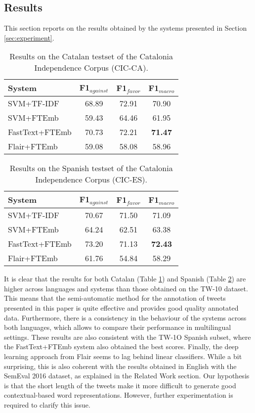 \documentclass[10pt, a4paper]{article}
\begin{document}
\subsection{Results}\label{sec:results}

This section reports on the results obtained by the systems presented in Section \ref{sec:experiment}.

\begin{table}[!ht]
\begin{tabular}{lccc}\hline
\textbf{System} & F1$_{against}$ & F1$_{favor}$ & F1$_{macro}$ \\ \hline
SVM+TF-IDF & 68.89 & 72.91 & 70.90 \\
SVM+FTEmb & 59.43 & 64.46 & 61.95 \\
FastText+FTEmb & 70.73 & 72.21 & \textbf{71.47} \\
Flair+FTEmb & 59.08 & 58.08 & 58.96 \\ \hline
\end{tabular}
\caption{Results on the Catalan testset of the Catalonia Independence Corpus (CIC-CA).}\label{tab:result_indep_ca}
\end{table}

\begin{table}[!ht]
\centering
\begin{tabular}{lccc}\hline
\textbf{System} & F1$_{against}$ & F1$_{favor}$ & F1$_{macro}$ \\ \hline
SVM+TF-IDF & 70.67 & 71.50 & 71.09 \\
SVM+FTEmb & 64.24 & 62.51 & 63.38 \\
FastText+FTEmb & 73.20 & 71.13 & \textbf{72.43} \\
Flair+FTEmb & 61.76 & 54.84 & 58.29 \\ \hline
\end{tabular}
\caption{Results on the Spanish testset of the Catalonia Independence Corpus (CIC-ES).}\label{tab:result_indep_es}
\end{table}

It is clear that the results for both Catalan (Table \ref{tab:result_indep_ca}) and Spanish (Table \ref{tab:result_indep_es}) are higher across languages and systems than those obtained on the TW-10 dataset. This means that the semi-automatic method for the annotation of tweets presented in this paper is quite effective and provides good quality annotated data. Furthermore, there is a consistency in the behaviour of the systems across both languages, which allows to compare their performance in multilingual settings. These results are also consistent with the TW-1O Spanish subset, where the FastText+FTEmb system also obtained the best scores. Finally, the deep learning approach from Flair seems to lag behind linear classifiers. While a bit surprising, this is also coherent with the results obtained in English with the SemEval 2016 dataset, as explained in the Related Work section. Our hypothesis is that the short length of the tweets make it more difficult to generate good contextual-based word representations. However, further experimentation is required to clarify this issue.
\end{document}
